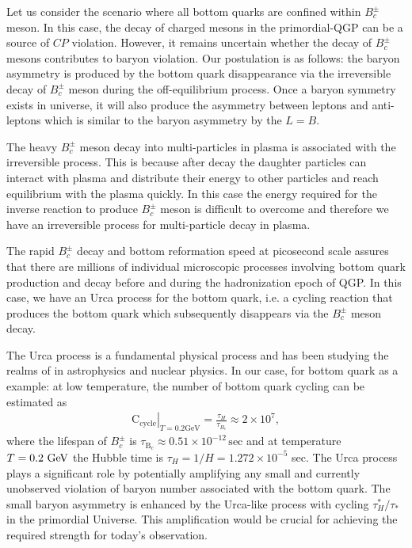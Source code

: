 Let us consider the scenario where all bottom quarks are confined within $B_c^\pm$ meson. In this case, the decay of charged mesons in the primordial-QGP can be a source of $CP$ violation. However, it remains uncertain whether the decay of $B_c^\pm$ mesons contributes to baryon violation. Our postulation is as follows: the baryon asymmetry is produced by the bottom quark disappearance via the irreversible decay of $B^\pm_c$ meson during the off-equilibrium process. Once a baryon symmetry exists in universe, it will also produce the asymmetry between leptons and anti-leptons which is similar to the baryon asymmetry by the $L=B$.

The heavy $B_c^\pm$ meson decay into multi-particles in plasma is associated with the irreversible process. This is because after decay the daughter particles can interact with plasma and distribute their energy to other particles and reach equilibrium with the plasma quickly. In this case the energy required for the inverse reaction to produce $B_c^\pm$ meson is difficult to overcome and therefore we have an irreversible process for multi-particle decay in plasma.


The rapid $B_c^\pm$ decay and bottom reformation speed at picosecond scale assures that there are millions of individual microscopic processes involving bottom quark production and decay before and during the hadronization epoch of QGP. In this case, we have an Urca process for the bottom quark, i.e. a cycling reaction that produces the bottom quark which subsequently disappears via the $B_c^\pm$ meson decay. 

The Urca process is a fundamental physical process and has been studying the realms of in astrophysics and nuclear physics. In our case, for bottom quark as a example: at low temperature, the number of bottom quark cycling can be estimated as
\begin{align}
\left.\mathrm{C_{cycle}}\right|_{T=0.2\mathrm{GeV}}=\frac{\tau_H}{\tau_{B_c}}\approx2\times10^7,
\end{align}
where the lifespan of $B_c^\pm$ is $\tau_{\mathrm{B}_c}\approx0.51\times10^{-12}\,\mathrm{sec}$ and at temperature $T=0.2\text{ GeV}$ the Hubble time is $\tau_H=1/H=1.272\times10^{-5}$ sec. The Urca process plays a significant role by potentially amplifying any small and currently unobserved violation of baryon number associated with the bottom quark. The small baryon asymmetry is enhanced by the Urca-like process with cycling ${\tau^\ast_H}/{\tau_\ast}$ in the primordial Universe.
This amplification would be crucial for achieving the required strength for today's observation. 


